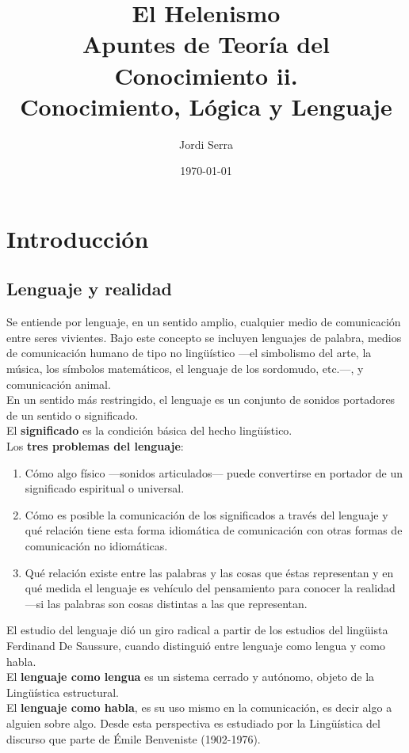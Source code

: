 \documentclass[a4paper, 11pt, twocolumn, spanish]{article}
\author{Jordi Serra}
\date{\today}
\title{El Helenismo\\\medskip
\large Apuntes de Teoría del Conocimiento ii.\\
Conocimiento, Lógica y Lenguaje}
\begin{document}
\maketitle
\tableofcontents


\section{Introducción}
\label{sec:org026d571}
\subsection{Lenguaje y realidad}
\label{sec:orge699822}
Se entiende por lenguaje, en un sentido amplio, cualquier medio de
comunicación entre seres vivientes. Bajo este concepto se incluyen
lenguajes de palabra, medios de comunicación humano de tipo no
lingüístico —el simbolismo del arte, la música, los símbolos
matemáticos, el lenguaje de los sordomudo, etc.—, y comunicación
animal.\\

En un sentido más restringido, el lenguaje es un conjunto de sonidos
portadores de un sentido o significado.\\
El \textbf{significado} es la condición básica del hecho lingüístico.\\
Los \textbf{tres problemas del lenguaje}:
\begin{enumerate}
\item Cómo algo físico —sonidos articulados— puede convertirse en
portador de un significado espiritual o universal.
\item Cómo es posible la comunicación de los significados a través del
lenguaje y qué relación tiene esta forma idiomática de
comunicación con otras formas de comunicación no idiomáticas.
\item Qué relación existe entre las palabras y las cosas que éstas
representan y en qué medida el lenguaje es vehículo del
pensamiento para conocer la realidad —si las palabras son cosas
distintas a las que representan.
\end{enumerate}

El estudio del lenguaje dió un giro radical a partir de los estudios
del lingüista Ferdinand De Saussure, cuando distinguió entre lenguaje
como lengua y como habla.\\
El \textbf{lenguaje como lengua} es un sistema cerrado y autónomo, objeto de
la Lingüística estructural.\\
El \textbf{lenguaje como habla}, es su uso mismo en la comunicación, es decir
algo a alguien sobre algo. Desde esta perspectiva es estudiado por la
Lingüística del discurso que parte de Émile Benveniste (1902-1976).\\
\end{document}
